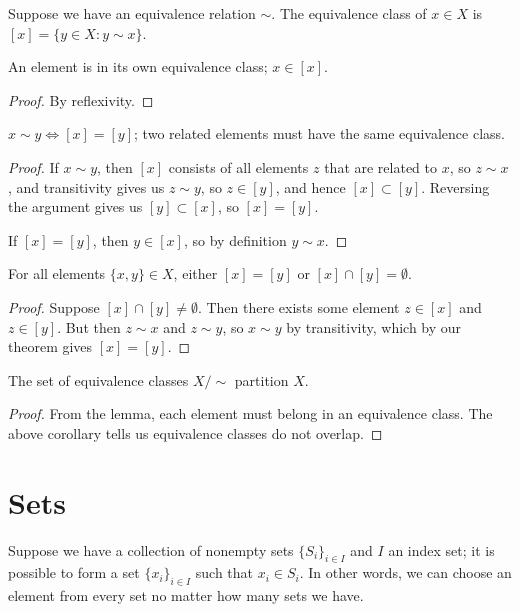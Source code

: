\begin{definition}
    Suppose we have an equivalence relation \(\sim\).
    The equivalence class of \(x \in X\) is
    \([x] = \{y \in X : y \sim x\}\).
\end{definition}
\begin{lemma}
    An element is in its own equivalence class; \(x \in [x]\).
\end{lemma}
\begin{proof}
    By reflexivity.
\end{proof}
\begin{theorem}
    \(x \sim y \iff [x] = [y]\);
    two related elements must have the same equivalence class.
\end{theorem}
\begin{proof}
    If \(x \sim y\),
    then \([x]\) consists of all elements \(z\) that are related to \(x\),
    so \(z \sim x\), and transitivity gives us \(z \sim y\),
    so \(z \in [y]\), and hence \([x] \subset [y]\).
    Reversing the argument gives us \([y] \subset [x]\),
    so \([x] = [y]\).

    If \([x] = [y]\), then \(y \in [x]\),
    so by definition \(y \sim x\).
\end{proof}
\begin{corollary}
    For all elements \(\{x,y\} \in X\),
    either \([x] = [y]\) or \([x] \cap [y] = \emptyset\).
\end{corollary}
\begin{proof}
    Suppose \([x] \cap [y] \neq \emptyset\).
    Then there exists some element \(z \in [x]\) and \(z \in [y]\).
    But then \(z \sim x\) and \(z \sim y\),
    so \(x \sim y\) by transitivity,
    which by our theorem gives \([x] = [y]\).
\end{proof}

\begin{theorem}\label{thm:equiv-class-partition}
    The set of equivalence classes \(X/{\sim}\) partition \(X\).
\end{theorem}
\begin{proof}
    From the lemma,
    each element must belong in an equivalence class.
    The above corollary tells us equivalence classes do not overlap.
\end{proof}


\section{Sets}

\begin{axiom}\label{ax:choice}
    Suppose we have a collection of nonempty sets \({\{S_i\}}_{i \in I}\)
    and \(I\) an index set;
    it is possible to form a set \({\{x_i\}}_{i \in I}\)
    such that \(x_i \in S_i\).
    In other words,
    we can choose an element from every set
    no matter how many sets we have.
\end{axiom}

